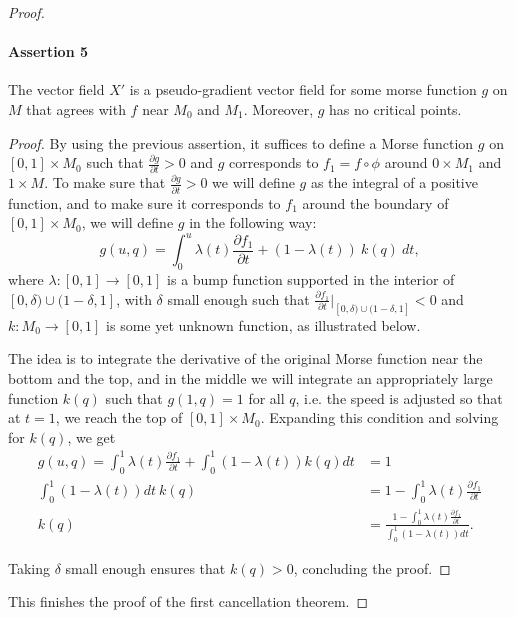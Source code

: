 \begin{proof}
\paragraph{Assertion 5}
The vector field $X'$ is a pseudo-gradient vector field for some morse function  $g$ on $M$ that agrees with $f$ near  $M_0$ and $M_1$.
Moreover, $g$ has no critical points.
\begin{proof}
    By using the previous assertion,
    it suffices to define a Morse function $g$ on $[0, 1] \times M_0$ such that $\frac{\partial g}{\partial t} > 0$ and $g$ corresponds to  $ f_1 = f  \circ  \phi$ around $0 \times M_1$ and $1 \times M$.
    To make sure that $\frac{\partial g}{\partial t} > 0$ we will define $g$ as the integral of a positive function,
    and to make sure it corresponds to $f_1$ around the boundary of $[0,1] \times M_0$, we will define $g$ in the following way:
     \[
         g(u, q) = \int_0^{u} \lambda(t) \frac{\partial f_1}{\partial t} + (1-\lambda(t))\: k(q) \: dt
    ,\] 
    where $\lambda: [0,1] \to  [0,1]$ is a bump function supported in the interior of $[0, \delta) \cup (1-\delta, 1]$, with $\delta$ small enough such that $\frac{\partial f_1}{\partial t}\big|_{[0, \delta) \cup (1-\delta, 1]} < 0$ and $k: M_0 \to [0,1]$ is some yet unknown function, as illustrated below.
    \begin{figure}[H]
        \centering
    \end{figure}

    The idea is to integrate the derivative of the original Morse function near the bottom and the top, and in the middle we will integrate an appropriately large function $k(q)$ such that  $g(1, q) = 1$ for all $q$, i.e. the speed is adjusted so that at $t=1$, we reach the top of $[0,1] \times M_0$.
    Expanding this condition and solving for $k(q)$, we get
     \begin{align*}
         g(u, q) = \int_{0}^{1} \lambda(t) \frac{\partial f_1}{\partial t}  + \int_{0}^{1}  (1-\lambda(t)) k(q) dt &= 1\\
          \int_{0}^{1}  (1-\lambda(t))  dt \  k(q)&= 1 - \int_{0}^{1} \lambda(t) \frac{\partial f_1}{\partial t}\\
          k(q)&= \frac{1 - \int_{0}^{1} \lambda(t) \frac{\partial f_1}{\partial t}}{\int_{0}^{1}  (1-\lambda(t))  dt}
    .\end{align*} 

    Taking $\delta$ small enough ensures that  $k(q) > 0$, concluding the proof.
\end{proof}

This finishes the proof of the first cancellation theorem.
\renewcommand{\qedsymbol}{\ensuremath{\square}}
\end{proof}

